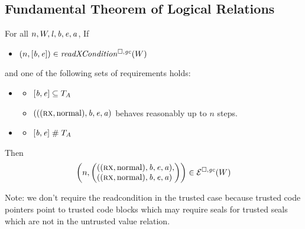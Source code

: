 \documentclass[a4paper]{article}
\begin{document}
\subsection{Fundamental Theorem of Logical Relations}
\begin{theorem}[FTLR]
  \label{thm:ftlr}
  For all $n,W,\mathit{l},\mathit{b},\mathit{e},\mathit{a}$,
  If
  \begin{itemize}
  \item $\npair{[\baddr,\eaddr]} \in \xReadCond{W}$
  \end{itemize}
  and one of the following sets of requirements holds:
  \begin{itemize}
  \item \begin{itemize}
    \item $[\mathit{b},\mathit{e}] \subseteq T_{A}$
    \item $({((\textsc{rx},\mathrm{normal}),\mathit{b},\mathit{e},\mathit{a})}$ behaves reasonably up to $n$ steps.
    \end{itemize}
  \item
    \begin{itemize}
    \item $[\mathit{b},\mathit{e}] \mathrel{\#} T_{A}$
    \end{itemize}
  \end{itemize}
  Then
  \[
    \npair{\left(\arraycolsep=0pt\array{l}((\rx,\normal),\baddr,\eaddr,\aaddr),\\
      ((\rx,\normal),\baddr,\eaddr,\aaddr)\endarray\right)} \in \lre(W)
  \]
\end{theorem}
Note: we don't require the readcondition in the trusted case because trusted code pointers point to trusted code blocks which may require seals for trusted seals which are not in the untrusted value relation.
\end{document}
